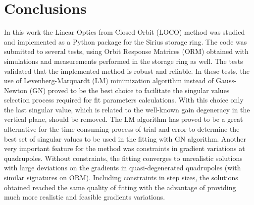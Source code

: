 \chapter*[Conclusions]{Conclusions}

    In this work the Linear Optics from Closed Orbit (LOCO) method was studied and implemented as a Python package for the Sirius storage ring. The code was submitted to several tests, using Orbit Response Matrices (ORM) obtained with simulations and measurements performed in the storage ring as well. The tests validated that the implemented method is robust and reliable. In these tests, the use of Levenberg-Marquardt (LM) minimization algorithm instead of Gauss-Newton (GN) proved to be the best choice to facilitate the singular values selection process required for fit parameters calculations. With this choice only the last singular value, which is related to the well-known gain degeneracy in the vertical plane, should be removed. The LM algorithm has proved to be a great alternative for the time consuming process of trial and error to determine the best set of singular values to be used in the fitting with GN algorithm. Another very important feature for the method was constraints in gradient variations at quadrupoles. Without constraints, the fitting converges to unrealistic solutions with large deviations on the gradients in quasi-degenerated quadrupoles (with similar signatures on ORM). Including constraints in step sizes, the solutions obtained reached the same quality of fitting with the advantage of providing much more realistic and feasible gradients variations.
    
